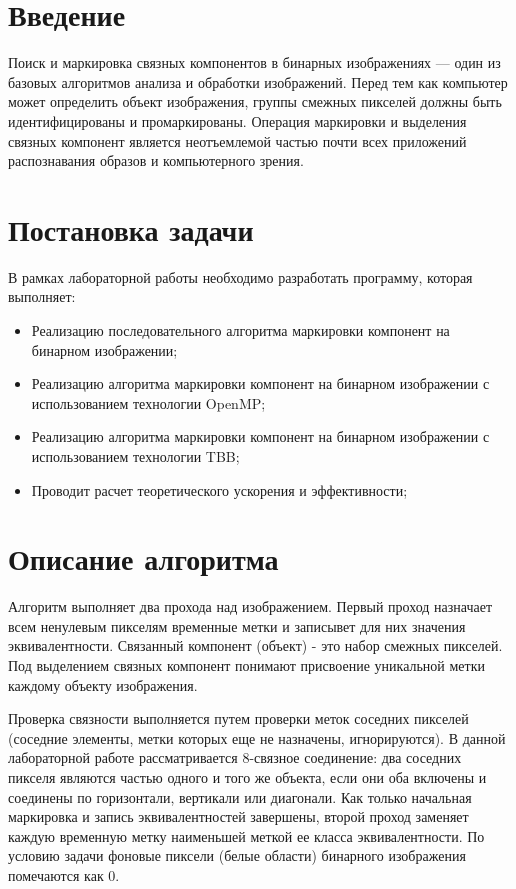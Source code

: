 \documentclass[12pt]{article}
\begin{document}
\setcounter{page}{2}

\tableofcontents
\newpage

\section*{Введение}
 \par Поиск и маркировка связных компонентов в бинарных изображениях — один из базовых алгоритмов анализа и обработки изображений. Перед тем как компьютер может определить объект изображения, группы смежных пикселей должны быть идентифицированы и промаркированы. Операция маркировки и выделения связных компонент является неотъемлемой частью почти всех приложений распознавания образов и компьютерного зрения. 
 
\section*{Постановка задачи}
В рамках лабораторной работы необходимо разработать программу, которая выполняет:  
\begin{itemize}
    \item Реализацию последовательного алгоритма маркировки компонент на бинарном изображении;

	\item Реализацию алгоритма маркировки компонент на бинарном изображении с использованием технологии OpenMP;

	\item Реализацию алгоритма маркировки компонент на бинарном изображении с использованием технологии TBB;
	
	\item Проводит расчет теоретического ускорения и эффективности;
\end{itemize}
\newpage
\section*{Описание алгоритма}
Алгоритм выполняет два прохода над изображением. Первый проход назначает всем ненулевым пикселям временные метки и записывет для них значения эквивалентности. Связанный компонент (объект) - это набор смежных пикселей. Под выделением связных компонент понимают присвоение уникальной метки каждому объекту изображения. 
\par Проверка связности выполняется путем проверки меток соседних пикселей (соседние элементы, метки которых еще не назначены, игнорируются). В данной лабораторной работе рассматривается 8-связное соединение: два соседних пикселя являются частью одного и того же объекта, если они оба включены и соединены по горизонтали, вертикали или диагонали. Как только начальная маркировка и запись эквивалентностей завершены, второй проход заменяет каждую временную метку наименьшей меткой ее класса эквивалентности.
По условию задачи фоновые пиксели (белые области) бинарного изображения помечаются как 0.
\end{document}

